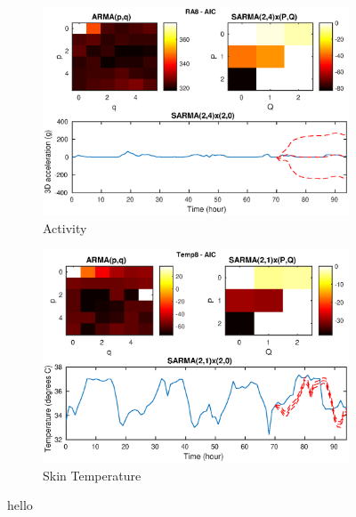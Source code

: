 \documentclass[a4paper]{proc}
\begin{document}
\begin{figure}
    \begin{subfigure}[b]{\textwidth}
        \includegraphics[width=\textwidth]{aic_ra_8.eps}
        \caption{Activity}
    \end{subfigure}
    \begin{subfigure}[b]{\textwidth}
        \includegraphics[width=\textwidth]{aic_temp_8.eps}
        \caption{Skin Temperature}
    \end{subfigure}
    \caption{hello}
    \label{fig:sarmafit}
\end{figure}
\end{document}
